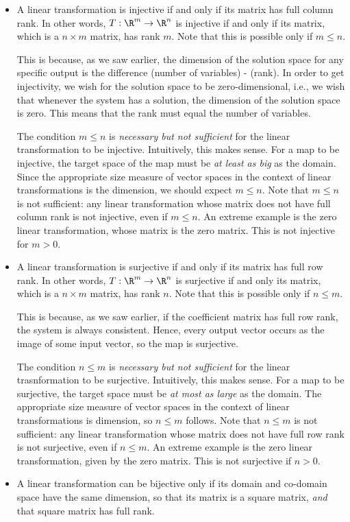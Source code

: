 \documentclass[10pt]{amsart}
\begin{document}
\begin{itemize}
\item A linear transformation is injective if and only if its matrix
  has full column rank. In other words, $T: \R^m \to \R^n$ is
  injective if and only if its matrix, which is a $n \times m$ matrix,
  has rank $m$. Note that this is possible only if $m \le n$.

  This is because, as we saw earlier, the dimension of the solution
  space for any specific output is the difference (number of
  variables) - (rank). In order to get injectivity, we wish for the
  solution space to be zero-dimensional, i.e., we wish that whenever
  the system has a solution, the dimension of the solution space is
  zero. This means that the rank must equal the number of variables.

  The condition $m \le n$ is {\em necessary but not sufficient} for
  the linear transformation to be injective. Intuitively, this makes
  sense. For a map to be injective, the target space of the map must
  be {\em at least as big} as the domain. Since the appropriate size
  measure of vector spaces in the context of linear transformations is
  the dimension, we should expect $m \le n$. Note that $m \le n$ is
  not sufficient: any linear transformation whose matrix does not have
  full column rank is not injective, even if $m \le n$. An extreme
  example is the zero linear transformation, whose matrix is the zero
  matrix. This is not injective for $m > 0$.
\item A linear transformation is surjective if and only if its matrix
  has full row rank. In other words, $T: \R^m \to \R^n$ is surjective
  if and only its matrix, which is a $n \times m$ matrix, has rank
  $n$. Note that this is possible only if $n \le m$.

  This is because, as we saw earlier, if the coefficient matrix has
  full row rank, the system is always consistent. Hence, every output
  vector occurs as the image of some input vector, so the map is
  surjective.

  The condition $n \le m$ is {\em necessary but not sufficient} for
  the linear trasnformation to be surjective. Intuitively, this makes
  sense. For a map to be surjective, the target space must be {\em at
    most as large} as the domain. The appropriate size measure of
  vector spaces in the context of linear transformations is dimension,
  so $n \le m$ follows. Note that $n \le m$ is not sufficient: any
  linear transformation whose matrix does not have full row rank is
  not surjective, even if $n \le m$. An extreme example is the zero
  linear transformation, given by the zero matrix. This is not
  surjective if $n > 0$.
\item A linear transformation can be bijective only if its domain and
  co-domain space have the same dimension, so that its matrix is a
  square matrix, {\em and} that square matrix has full rank. 
\end{itemize}
\end{document}
